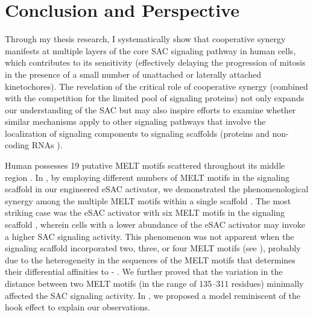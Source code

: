 \chapter{Conclusion and Perspective}
\label{chpt:conclusion}

Through my thesis research, I systematically show that cooperative synergy manifests at multiple layers of the core SAC signaling pathway in human cells, which contributes to its sensitivity (effectively delaying the progression of mitosis in the presence of a small number of unattached or laterally attached kinetochores). The revelation of the critical role of cooperative synergy (combined with the competition for the limited pool of signaling proteins) not only expands our understanding of the SAC but may also inspire efforts to examine whether similar mechanisms apply to other signaling pathways that involve the localization of signaling components to signaling scaffolds (proteins and non-coding RNAs \cite{ScaffoldlncRNA}).

Human  possesses 19 putative MELT motifs scattered throughout its middle region \cite{MELTEvolution}. In , by employing different numbers of MELT motifs in the signaling scaffold in our engineered eSAC activator, we demonstrated the phenomenological synergy among the multiple MELT motifs within a single scaffold \cite{eSAC}. The most striking case was the eSAC activator with six MELT motifs in the signaling scaffold , wherein cells with a lower abundance of the eSAC activator may invoke a higher SAC signaling activity. This phenomenon was not apparent when the signaling scaffold incorporated two, three, or four MELT motifs (see ), probably due to the heterogeneity in the sequences of the MELT motifs that determines their differential affinities to - \cite{MELTActivity, eSAC}. We further proved that the variation in the distance between two MELT motifs (in the range of 135--311 residues) minimally affected the SAC signaling activity. In , we proposed a model reminiscent of the hook effect to explain our observations.

